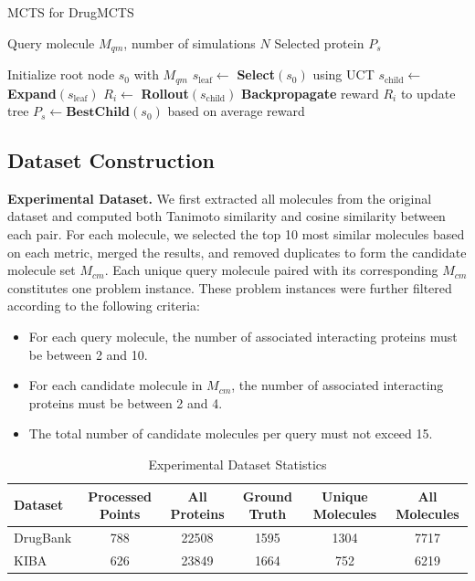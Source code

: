 \documentclass[letterpaper,twocolumn,10pt]{llncs}
\begin{document}
\begin{algorithm}[!htbp]
\caption{MCTS for DrugMCTS}
\label{alg:mcts}
\begin{algorithmic}[1]
\Require Query molecule $M_{qm}$, number of simulations $N$
\Ensure Selected protein $P_s$

\State Initialize root node $s_0$ with $M_{qm}$
    \State $s_{\text{leaf}} \gets$ \textbf{Select}$(s_0)$ using UCT
    \State $s_{\text{child}} \gets$ \textbf{Expand}$(s_{\text{leaf}})$
    \State $R_i \gets$ \textbf{Rollout}$(s_{\text{child}})$ 
    \State \textbf{Backpropagate} reward $R_i$ to update tree
\EndFor
\State \Return $P_s \gets \textbf{BestChild}(s_0)$ based on average reward
\end{algorithmic}
\end{algorithm}

\subsection{Dataset Construction}
\label{sec:dataset}
\textbf{Experimental Dataset.} We first extracted all molecules from the original dataset and computed both Tanimoto similarity and cosine similarity between each pair. For each molecule, we selected the top 10 most similar molecules based on each metric, merged the results, and removed duplicates to form the candidate molecule set $M_{cm}$. Each unique query molecule paired with its corresponding $M_{cm}$ constitutes one problem instance. These problem instances were further filtered according to the following criteria:
\begin{itemize}
\item For each query molecule, the number of associated interacting proteins must be between 2 and 10.
\item For each candidate molecule in $M_{cm}$, the number of associated interacting proteins must be between 2 and 4.
\item The total number of candidate molecules per query must not exceed 15.
\end{itemize}

\begin{table}[!htbp]
\centering
\caption{Experimental Dataset Statistics}
\label{tab:dataset_stats}
\begin{tabular}{l *{5}{S[table-format=4.0]}} %
\toprule
{Dataset} & {Processed Points} & {All Proteins} & {Ground Truth} & {Unique Molecules} & {All Molecules} \\
\midrule
DrugBank       & 788  & 22508 & 1595 & 1304 & 7717 \\
KIBA     & 626  & 23849 & 1664 &  752 & 6219 \\
\bottomrule
\end{tabular}
\end{table}
\end{document}
